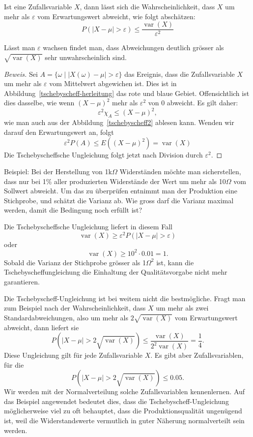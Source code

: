 \begin{satz}
Ist eine Zufallsvariable $X$, dann lässt sich die Wahrscheinlichkeit,
dass $X$ um mehr als $\varepsilon$ vom Erwartungswert abweicht, wie
folgt abschätzen:
\[
P(|X-\mu| >\varepsilon)\le\frac{\operatorname{var}(X)}{\varepsilon^2}
\]
\end{satz}

Lässt man $\varepsilon$ wachsen findet man, dass Abweichungen
deutlich grösser als $\sqrt{\operatorname{var}(X)}$ 
sehr unwahrscheinlich sind.

\begin{proof}[Beweis]
Sei $A =\{\omega\;|\;|X(\omega)-\mu|>\varepsilon\}$ das Ereignis, dass die
Zufallsvariable $X$ um mehr als $\varepsilon$ vom Mittelwert abgewichen
ist.
Dies ist in Abbildung~\ref{tschebyscheff-herleitung} das rote und blaue Gebiet.
Offensichtlich ist dies dasselbe, wie wenn $(X-\mu)^2$ mehr als
$\varepsilon^2$ von 0 abweicht.
Es gilt daher:
\[
\varepsilon^2 \chi_{A} \le (X-\mu)^2,
\]
wie man auch aus der Abbildung~\ref{tschebyscheff2} ablesen kann.
Wenden wir darauf den Erwartungswert an, folgt
\[
\varepsilon^2 P(A)\le E((X-\mu)^2)=\operatorname{var}(X)
\]
Die Tschebyscheffsche Ungleichung folgt jetzt nach Division durch
$\varepsilon^2$.
\end{proof}
Beispiel:
Bei der Herstellung von 1k$\Omega$ Widerständen
möchte man sicherstellen,
dass nur bei 1\% aller produzierten Widerstände der Wert um mehr als
10$\Omega$ vom Sollwert abweicht.
Um das zu überprüfen entnimmt man der
Produktion eine Stichprobe, und schätzt die Varianz ab.
Wie gross darf die
Varianz maximal werden, damit die Bedingung noch erfüllt ist?

Die Tschebyscheffsche Ungleichung liefert in diesem Fall
\[
\operatorname{var}(X)\ge\varepsilon^2P(|X-\mu| >\varepsilon)
\]
oder
\[
\operatorname{var}(X)\ge 10^2\cdot 0.01=1.
\]
Sobald die Varianz der Stichprobe grösser als 1$\Omega^2$ ist, kann die
Tschebyscheffungleichung die Einhaltung der Qualitätsvorgabe nicht
mehr garantieren.

Die Tschebyscheff-Ungleichung ist bei weitem nicht die bestmögliche.
Fragt man zum Beispiel nach der Wahrscheinlichkeit, dass $X$ um mehr
als zwei Standardabweichungen, also um mehr als $2\sqrt{\operatorname{var}(X)}$ vom
Erwartungswert abweicht, dann liefert sie
\[
P(|X-\mu|>2\sqrt{\operatorname{var}(X)})
\le\frac{\operatorname{var}(X)}{2^2\operatorname{var}(X)}=\frac14.
\]
Diese Ungleichung gilt für jede Zufallsvariable $X$.
Es gibt aber Zufallsvariablen, für die 
\[
P(|X-\mu|>2\sqrt{\operatorname{var}(X)})\le 0.05.
\]
Wir werden mit der Normalverteilung solche Zufallsvariablen kennenlernen.
Auf das Beispiel angewendet bedeutet dies, dass die Tschebyscheff-Ungleichung
möglicherweise viel zu oft behauptet, dass die Produktionsqualität ungenügend
ist, weil die Widerstandswerte vermutlich in guter Näherung normalverteilt
sein werden.

